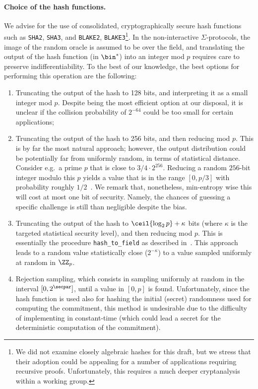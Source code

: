 \documentclass[runningheads]{llncs}
\begin{document}
 \paragraph{Choice of the hash functions.} We advise for the use of consolidated, cryptographically secure hash functions such as \verb|SHA2|, \verb|SHA3|, and \verb|BLAKE2|, \verb|BLAKE3|\footnote{We did not examine closely algebraic hashes for this draft, but we stress that their adoption could be appealing for a number of applications requiring recursive proofs. Unfortunately, this requires a much deeper cryptanalysis within a working group.}.
 In the non-interactive $\Sigma$-protocols, the image of the random oracle is assumed to be over the field, and translating the output of the hash function (in $\bin^*$) into an integer mod $p$ requires care to preserve indifferentiability.
To the best of our knowledge, the best options for performing this operation are the following:
\begin{enumerate}[label=$(\alph*)$]
  \item\label{item:truncate-128}  Truncating the output of the hash to 128 bits, and interpreting it as a small integer mod $p$.
  Despite being the most efficient option at our disposal, it is unclear if the collision probability of $2^{-64}$ could be too small for certain applications;
  \item\label{item:truncate-256}  Truncating the output of the hash to 256 bits, and then reducing mod $p$.
  This is by far the most natural approach; however, the output distribution could be potentially far from uniformly random, in terms of statistical distance.
 Consider e.g.\ a prime $p$ that is close to $3/4 \cdot 2^{256}$. Reducing a random $256$-bit integer modulo this $p$ yields a value that is in the range $[0, p / 3]$ with probability roughly $1/2$~\cite{hash-to-curve}.
  We remark that, nonetheless, min-entropy wise this will cost at most one bit of security.
  Namely, the chances of guessing a specific challenge is still than negligible despite the bias.
  \item\label{item:truncate-cfrg} Truncating the output of the hash to $\ceil{\log_2 p} + \kappa$ bits (where $\kappa$ is the targeted statistical
  security level), and then reducing mod $p$.
  This is essentially the procedure
  \verb|hash_to_field| as described in~\cite[Section 5]{hash-to-curve}.
  This approach leads to a random value statistically close ($2^{-\kappa}$) to a value sampled uniformly at random in $\ZZ_p$.
  \item Rejection sampling, which consists in sampling uniformly at random in the interval $[0, 2^\secpar]$, until a value in $[0, p]$ is found.
  Unfortunately, since the hash function is used also for hashing the initial (secret) randomness used for computing the commitment, this method is undesirable due to the difficulty of implementing in constant-time (which could lead a secret for the deterministic computation of the commitment).
\end{enumerate}
\end{document}
